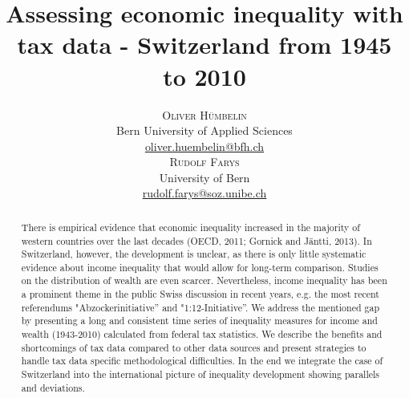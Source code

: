 \documentclass[twoside]{article}\usepackage[]{graphicx}\usepackage[]{color}
\title{\vspace{-15mm}\fontsize{24pt}{10pt}\selectfont\textbf{Assessing economic inequality with tax data - Switzerland from 1945 to 2010}} %
\author{
\large
\textsc{Oliver Hümbelin}\\[2mm] %
\normalsize Bern University of Applied Sciences \\ %
\normalsize \href{mailto:oliver.huembelin@bfh.ch}{oliver.huembelin@bfh.ch} %
\vspace{5mm}\\
\large
\textsc{Rudolf Farys}\\[2mm] %
\normalsize University of Bern \\ %
\normalsize \href{mailto:rudolf.farys@soz.unibe.ch}{rudolf.farys@soz.unibe.ch} %
\vspace{-5mm}
}
\date{}
\begin{document}
\maketitle 

\thispagestyle{fancy} %





\begin{abstract}

There is empirical evidence that economic inequality increased in the majority of western countries over the last decades (OECD, 2011; Gornick and Jäntti, 2013). In Switzerland, however, the development is unclear, as there is only little systematic evidence about income inequality that would allow for long-term comparison. Studies on the distribution of wealth are even scarcer. Nevertheless, income inequality has been a prominent theme in the public Swiss discussion in recent years, e.g. the most recent referendums "Abzockerinitiative'' and "1:12-Initiative''. We address the mentioned gap by presenting a long and consistent time series of inequality measures for income and wealth (1943-2010) calculated from federal tax statistics. We describe the benefits and shortcomings of tax data compared to other data sources and present strategies to handle tax data specific methodological difficulties. In the end we integrate the case of Switzerland into the international picture of inequality development showing parallels and deviations.


\end{abstract}




\end{document}
